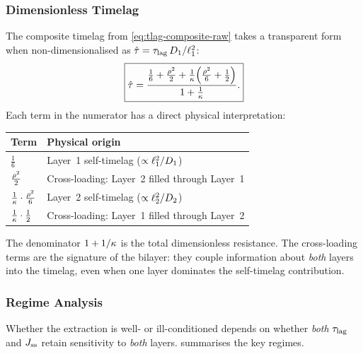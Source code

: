 \subsubsection{Dimensionless Timelag}

The composite timelag from \cref{eq:tlag-composite-raw} takes a transparent
form when non-dimensionalised as $\hat{\tau} = \tau_{\mathrm{lag}}\,D_{1}/\ell_{1}^2$:
\begin{equation}
  \label{eq:tlag-dimensionless}
  \boxed{
  \hat{\tau}
  = \frac{\tfrac{1}{6} + \tfrac{\rho^2}{2}
    + \tfrac{1}{\kappa}\!\left(\tfrac{\rho^2}{6}
    + \tfrac{1}{2}\right)}{1 + \tfrac{1}{\kappa}}.}
\end{equation}
Each term in the numerator has a direct physical interpretation:
\begin{center}
\begin{tabular}{@{}ll@{}}
\toprule
\textbf{Term} & \textbf{Physical origin} \\
\midrule
$\tfrac{1}{6}$ & Layer~1 self-timelag
  ($\propto \ell_{1}^2/D_{1}$) \\[3pt]
$\tfrac{\rho^2}{2}$ & Cross-loading: Layer~2 filled through Layer~1 \\[3pt]
$\tfrac{1}{\kappa}\cdot\tfrac{\rho^2}{6}$
  & Layer~2 self-timelag ($\propto \ell_{2}^2/D_{2}$) \\[3pt]
$\tfrac{1}{\kappa}\cdot\tfrac{1}{2}$
  & Cross-loading: Layer~1 filled through Layer~2 \\
\bottomrule
\end{tabular}
\end{center}
The denominator $1 + 1/\kappa$ is the total dimensionless resistance.
The cross-loading terms are the signature of the bilayer: they couple
information about \emph{both} layers into the timelag, even when one
layer dominates the self-timelag contribution.

\subsubsection{Regime Analysis}

Whether the extraction is well- or ill-conditioned depends on whether
\emph{both} $\tau_{\mathrm{lag}}$ and $J_{\mathrm{ss}}$ retain sensitivity to \emph{both} layers.
 summarises the key regimes.

